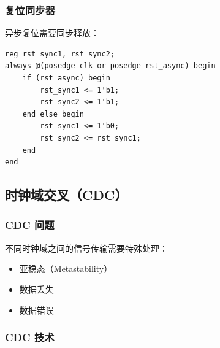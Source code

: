\subsubsection{复位同步器}

异步复位需要同步释放：

\begin{verbatim}
reg rst_sync1, rst_sync2;
always @(posedge clk or posedge rst_async) begin
    if (rst_async) begin
        rst_sync1 <= 1'b1;
        rst_sync2 <= 1'b1;
    end else begin
        rst_sync1 <= 1'b0;
        rst_sync2 <= rst_sync1;
    end
end
\end{verbatim}

\subsection{时钟域交叉（CDC）}

\subsubsection{CDC 问题}

不同时钟域之间的信号传输需要特殊处理：
\begin{itemize}
  \item 亚稳态（Metastability）
  \item 数据丢失
  \item 数据错误
\end{itemize}

\subsubsection{CDC 技术}


